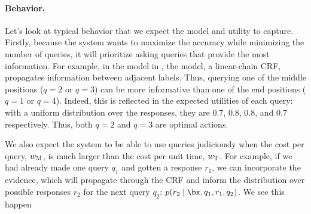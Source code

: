 
\paragraph{Behavior.}
Let's look at typical behavior that we expect the model and utility to capture.
Firstly, because the system wants to maximize the accuracy while minimizing the number of queries, it will prioritize asking queries that provide the most information.
For example,
in the model in , the model, a linear-chain CRF, propagates information between adjacent labels. 
Thus, querying one of the middle positions ($q = 2$ or $q = 3$) can be more informative than one of the end positions ($q = 1$ or $q = 4$).
Indeed, this is reflected in the expected utilities of each query: with a uniform distribution over the responses, they are $0.7$, $0.8$, $0.8$, and $0.7$ respectively. Thus, both $q = 2$ and $q = 3$ are optimal actions. 

We also expect the system to be able to use queries judiciously when the cost per query, $w_\text{M}$, is much larger than the cost per unit time, $w_\text{T}$.
For example,
if we had already made one query $q_1$ and gotten a response $r_1$,
we can incorporate the evidence, which will propagate through the CRF
and inform the distribution over possible responses $r_2$ for the next query $q_2$:
$p(r_2 \mid \bx, q_1, r_1, q_2)$.
We see this happen 

